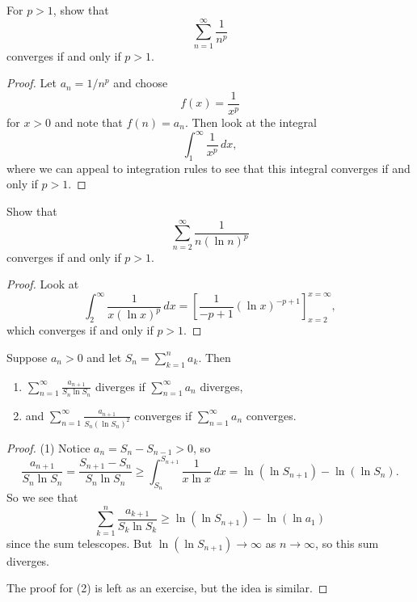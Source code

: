 \begin{example}
  For $p > 1$, show that
  \[
    \sum_{n = 1}^\infty \frac{1}{n^p}
  \]
  converges if and only if $p > 1$.
\end{example}

\begin{proof}
  Let $a_n = 1 / n^p$ and choose
  \[
    f(x) = \frac{1}{x^p}
  \]
  for $x > 0$ and note that $f(n) = a_n$.
  Then look at the integral
  \[
    \int_1^\infty \frac{1}{x^p}\, dx,
  \]
  where we can appeal to integration rules to see
  that this integral converges if and only if
  $p > 1$.
\end{proof}

\begin{example}
  Show that
  \[
    \sum_{n = 2}^\infty \frac{1}{n (\ln n)^p}
  \]
  converges if and only if $p > 1$.
\end{example}

\begin{proof}
  Look at
  \[
    \int_2^\infty \frac{1}{x (\ln x)^p}\, dx
    = \left[\frac{1}{-p + 1} (\ln x)^{-p + 1}\right]_{x = 2}^{x = \infty},
  \]
  which converges if and only if $p > 1$.
\end{proof}

\begin{example}
  Suppose $a_n > 0$ and let $S_n = \sum_{k = 1}^n a_k$.
  Then
  \begin{enumerate}
    \item $\displaystyle \sum_{n = 1}^\infty \frac{a_{n + 1}}{S_n \ln S_n}$ diverges if $\displaystyle \sum_{n = 1}^\infty a_n$ diverges,
    \item and $\displaystyle \sum_{n = 1}^\infty \frac{a_{n + 1}}{S_n (\ln S_n)^2}$ converges if $\displaystyle \sum_{n = 1}^\infty a_n$ converges.
  \end{enumerate}
\end{example}

\begin{proof}
  (1) Notice $a_n = S_n - S_{n - 1} > 0$, so
  \[
    \frac{a_{n + 1}}{S_n \ln S_n}
    = \frac{S_{n + 1} - S_n}{S_n \ln S_n}
    \ge \int_{S_n}^{S_{n + 1}} \frac{1}{x \ln x}\, dx
    = \ln(\ln S_{n + 1}) - \ln(\ln S_n).
  \]
  So we see that
  \[
    \sum_{k = 1}^n \frac{a_{k + 1}}{S_k \ln S_k}
    \ge \ln(\ln S_{n + 1}) - \ln(\ln a_1)
  \]
  since the sum telescopes. But
  $\ln(\ln S_{n + 1}) \to \infty$ as $n \to \infty$,
  so this sum diverges.

  The proof for (2) is left as an exercise, but the
  idea is similar.
\end{proof}

